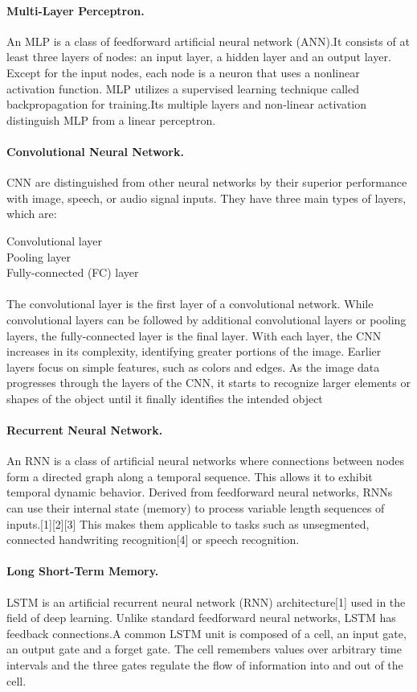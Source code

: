 \documentclass{article}
\begin{document}
\paragraph*{Multi-Layer Perceptron.}An MLP is a class of feedforward artificial neural network (ANN).It consists of at least three layers of nodes: an input layer, a hidden layer and an output layer. Except for the input nodes, each node is a neuron that uses a nonlinear activation function. MLP utilizes a supervised learning technique called backpropagation for training.Its multiple layers and non-linear activation distinguish MLP from a linear perceptron.

\paragraph*{Convolutional Neural Network.}
CNN are distinguished from other neural networks by their superior performance with image, speech, or audio signal inputs. They have three main types of layers, which are:

Convolutional layer \\
Pooling layer \\
Fully-connected (FC) layer \\ \\
The convolutional layer is the first layer of a convolutional network. While convolutional layers can be followed by additional convolutional layers or pooling layers, the fully-connected layer is the final layer. With each layer, the CNN increases in its complexity, identifying greater portions of the image. Earlier layers focus on simple features, such as colors and edges. As the image data progresses through the layers of the CNN, it starts to recognize larger elements or shapes of the object until it finally identifies the intended object

\paragraph*{Recurrent Neural Network.}
An RNN is a class of artificial neural networks where connections between nodes form a directed graph along a temporal sequence. This allows it to exhibit temporal dynamic behavior. Derived from feedforward neural networks, RNNs can use their internal state (memory) to process variable length sequences of inputs.[1][2][3] This makes them applicable to tasks such as unsegmented, connected handwriting recognition[4] or speech recognition.

\paragraph*{Long Short-Term Memory.}
LSTM is an artificial recurrent neural network (RNN) architecture[1] used in the field of deep learning. Unlike standard feedforward neural networks, LSTM has feedback connections.A common LSTM unit is composed of a cell, an input gate, an output gate and a forget gate. The cell remembers values over arbitrary time intervals and the three gates regulate the flow of information into and out of the cell.
\end{document}
